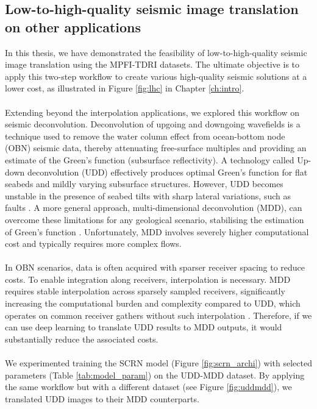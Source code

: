 \subsection{Low-to-high-quality seismic image translation on other applications}
In this thesis, we have demonstrated the feasibility of low-to-high-quality seismic image translation using the MPFI-TDRI datasets. The ultimate objective is to apply this two-step workflow to create various high-quality seismic solutions at a lower cost, as illustrated in Figure \ref{fig:lhc} in Chapter \ref{ch:intro}.
\\\\
Extending beyond the interpolation applications, we explored this workflow on seismic deconvolution. Deconvolution of upgoing and downgoing wavefields is a technique used to remove the water column effect from ocean-bottom node (OBN) seismic data, thereby attenuating free-surface multiples \cite{wang2009comes} and providing an estimate of the Green's function (subsurface reflectivity). A technology called Up-down deconvolution (UDD) effectively produces optimal Green’s function for flat seabeds and mildly varying subsurface structures. However, UDD becomes unstable in the presence of seabed tilts with sharp lateral variations, such as faults \cite{amundsen2001elimination,wang2009comes,boiero2021up}. A more general approach,  multi-dimensional deconvolution (MDD), can overcome these limitations for any geological scenario, stabilising the estimation of Green’s function \cite{wapenaar2011seismic}. Unfortunately, MDD involves severely higher computational cost and typically requires more complex flows.
\\\\
In OBN scenarios, data is often acquired with sparser receiver spacing to reduce costs. To enable integration along receivers, interpolation is necessary. MDD requires stable interpolation across sparsely sampled receivers, significantly increasing the computational burden and complexity compared to UDD, which operates on common receiver gathers without such interpolation \cite{wapenaar2011seismic,ravasi2015seismic}. Therefore, if we can use deep learning to translate UDD results to MDD outputs, it would substantially reduce the associated costs.
\\\\
We experimented training the SCRN model (Figure \ref{fig:scrn_archi}) with selected parameters (Table \ref{tab:model_param}) on the UDD-MDD dataset. By applying the same workflow but with a different dataset (see Figure \ref{fig:uddmdd}), we translated UDD images to their MDD counterparts.
